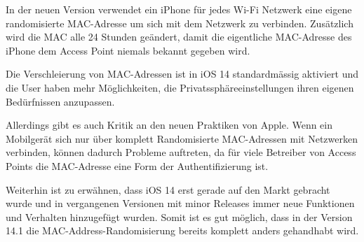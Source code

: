 In der neuen Version verwendet ein iPhone für jedes Wi-Fi Netzwerk eine eigene
randomisierte MAC-Adresse um sich mit dem Netzwerk zu verbinden. 
Zusätzlich wird die MAC alle 24 Stunden geändert, damit die eigentliche 
MAC-Adresse des iPhone dem Access Point niemals bekannt gegeben wird.

Die Verschleierung von MAC-Adressen ist in iOS 14 standardmässig aktiviert und
die User haben mehr Möglichkeiten, die Privatssphäreeinstellungen ihren eigenen
Bedürfnissen anzupassen.

Allerdings gibt es auch Kritik an den neuen Praktiken von Apple.
Wenn ein Mobilgerät sich nur über komplett Randomisierte MAC-Adressen mit 
Netzwerken verbinden, können dadurch Probleme auftreten, da für viele 
Betreiber von Access Points die MAC-Adresse eine Form der Authentifizierung ist.

Weiterhin ist zu erwähnen, dass iOS 14 erst gerade auf den Markt gebracht wurde und
in vergangenen Versionen mit minor Releases immer neue Funktionen und Verhalten
hinzugefügt wurden. 
Somit ist es gut möglich, dass in der Version 14.1 die MAC-Address-Randomisierung
bereits komplett anders gehandhabt wird.